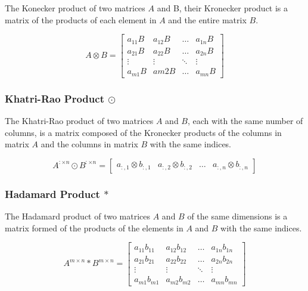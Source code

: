 \documentclass{article}
\begin{document}
The Konecker product of two matrices \(A\) and B, their Kronecker product is a matrix of the products of each element in \(A\) and the entire matrix \(B\).

\begin{equation}
    A \otimes B = \begin{bmatrix}
    a_{11}B & a_{12}B & \dots & a_{1n}B \\
    a_{21}B & a_{22}B & \dots & a_{2n}B \\
    \vdots & \vdots & \ddots & \vdots \\
    a_{m1}B & a{m2}B & \dots & a_{mn}B \end{bmatrix}
    \label{Kronecker} 
\end{equation}

\subsubsection{Khatri-Rao Product \(\odot\)}

The Khatri-Rao product of two matrices \(A\) and \(B\), each with the same number of columns, is a matrix composed of the Kronecker products of the columns in matrix \(A\) and the columns in matrix \(B\) with the same indices.

\begin{equation}
    A^{:\times n} \odot B^{:\times n} = \begin{bmatrix}
    a_{:,1} \otimes b_{:,1} & a_{:,2} \otimes b_{:,2} & \dots & a_{:,n} \otimes b_{:,n} \end{bmatrix}
    \label{Khatri-Rao}
\end{equation}

\subsubsection{Hadamard Product \(*\)}

The Hadamard product of two matrices \(A\) and \(B\) of the same dimensions is a matrix formed of the products of the elements in \(A\) and \(B\) with the same indices.

\begin{equation}
    A^{m \times n} * B^{m \times n} = \begin{bmatrix}
    a_{11}b_{11} & a_{12}b_{12} & \dots & a_{1n}b_{1n} \\
    a_{21}b_{21} & a_{22}b_{22} & \dots & a_{2n}b_{2n} \\
    \vdots & \vdots & \ddots & \vdots \\
    a_{m1}b_{m1} & a_{m2}b_{m2} & \dots & a_{mn}b_{mn} \end{bmatrix} 
    \label{Hadamard}
\end{equation}
\end{document}
